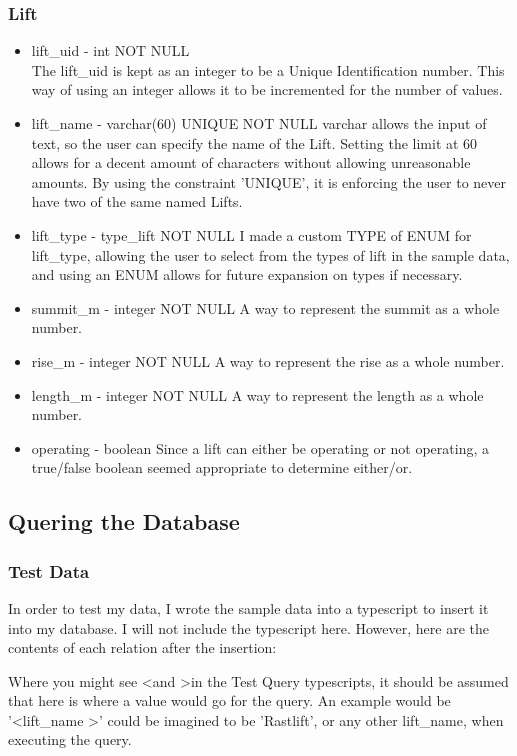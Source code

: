 \documentclass[11pt]{scrartcl} %
\begin{document}
\subsubsection{Lift}
\begin{itemize}
\item lift\_uid - int NOT NULL\\
The lift\_uid is kept as an integer to be a Unique Identification number. This way of using an integer allows it to be incremented for the number of values.
\item lift\_name - varchar(60) UNIQUE NOT NULL
varchar allows the input of text, so the user can specify the name of the Lift. Setting the limit at 60 allows for a decent amount of characters without allowing unreasonable amounts. By using the constraint 'UNIQUE', it is enforcing the user to never have two of the same named Lifts.
\item lift\_type - type\_lift NOT NULL
I made a custom TYPE of ENUM for lift\_type, allowing the user to select from the types of lift in the sample data, and using an ENUM allows for future expansion on types if necessary.
\item summit\_m - integer NOT NULL
A way to represent the summit as a whole number.
\item rise\_m - integer NOT NULL
A way to represent the rise as a whole number.
\item length\_m - integer NOT NULL
A way to represent the length as a whole number.
\item operating - boolean
Since a lift can either be operating or not operating, a true/false boolean seemed appropriate to determine either/or.
\end{itemize}

\subsection{Quering the Database}
\subsubsection{Test Data}
In order to test my data, I wrote the sample data into a typescript to insert it into my database. I will not include the typescript here. However, here are the contents of each relation after the insertion:


Where you might see \textless and \textgreater in the Test Query typescripts, it should be assumed that here is where a value would go for the query. An example would be '\textless lift\_name \textgreater ' could be imagined to be 'Rastlift', or any other lift\_name, when executing the query.
\end{document}
